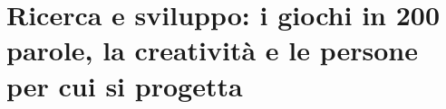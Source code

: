 %
%
%    
%    
%

\chapter[Ricerca e sviluppo]{Ricerca e sviluppo: i giochi in 200 parole, la
creatività e le persone per cui si progetta}
\label{a6:cap:ricerca}

